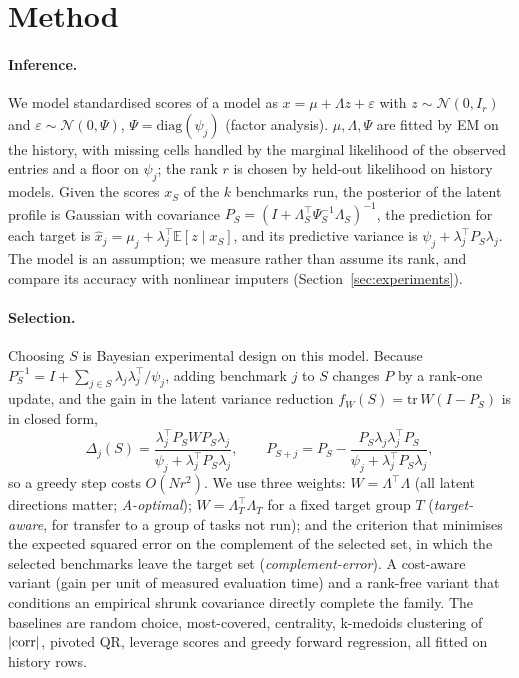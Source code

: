 \section{Method}
\label{sec:method}
\paragraph{Inference.}
We model standardised scores of a model as $x=\mu+\Lambda z+\varepsilon$ with $z\sim\mathcal N(0,I_r)$ and $\varepsilon\sim\mathcal N(0,\Psi)$, $\Psi=\mathrm{diag}(\psi_j)$ (factor analysis).
$\mu,\Lambda,\Psi$ are fitted by EM on the history, with missing cells handled by the marginal likelihood of the observed entries and a floor on $\psi_j$; the rank $r$ is chosen by held-out likelihood on history models.
Given the scores $x_S$ of the $k$ benchmarks run, the posterior of the latent profile is Gaussian with covariance $P_S=(I+\Lambda_S^\top\Psi_S^{-1}\Lambda_S)^{-1}$, the prediction for each target is $\hat x_j=\mu_j+\lambda_j^\top \mathbb{E}[z\mid x_S]$, and its predictive variance is $\psi_j+\lambda_j^\top P_S\lambda_j$.
The model is an assumption; we measure rather than assume its rank, and compare its accuracy with nonlinear imputers (Section~\ref{sec:experiments}).

\paragraph{Selection.}
Choosing $S$ is Bayesian experimental design on this model.
Because $P_S^{-1}=I+\sum_{j\in S}\lambda_j\lambda_j^\top/\psi_j$, adding benchmark $j$ to $S$ changes $P$ by a rank-one update, and the gain in the latent variance reduction $f_W(S)=\mathrm{tr}\,W(I-P_S)$ is in closed form,
\begin{equation}
\Delta_j(S)=\frac{\lambda_j^\top P_S W P_S\lambda_j}{\psi_j+\lambda_j^\top P_S\lambda_j},\qquad P_{S+j}=P_S-\frac{P_S\lambda_j\lambda_j^\top P_S}{\psi_j+\lambda_j^\top P_S\lambda_j},
\label{eq:gain}
\end{equation}
so a greedy step costs $O(Nr^2)$.
We use three weights: $W=\Lambda^\top\Lambda$ (all latent directions matter; \emph{A-optimal}); $W=\Lambda_T^\top\Lambda_T$ for a fixed target group $T$ (\emph{target-aware}, for transfer to a group of tasks not run); and the criterion that minimises the expected squared error on the complement of the selected set, in which the selected benchmarks leave the target set (\emph{complement-error}). 
A cost-aware variant (gain per unit of measured evaluation time) and a rank-free variant that conditions an empirical shrunk covariance directly complete the family.
The baselines are random choice, most-covered, centrality, k-medoids clustering of $|{\rm corr}|$, pivoted QR, leverage scores and greedy forward regression, all fitted on history rows.

